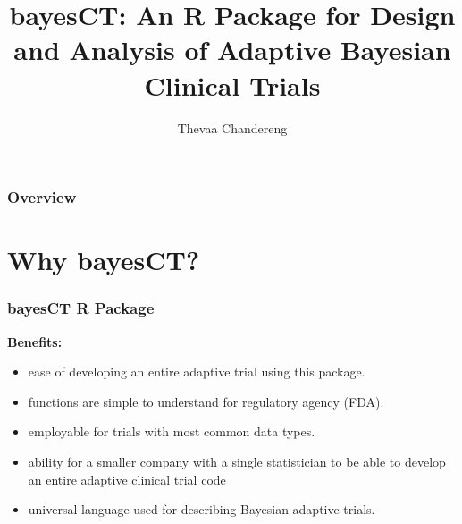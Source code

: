 \documentclass{beamer}
\title[Bayesian Clinical Trials]{bayesCT: An R Package for Design and Analysis of Adaptive Bayesian Clinical Trials} %
\author{Thevaa Chandereng} %
\institute[UW-Madison] %
{
UW-Madison \\ %
\medskip
\textit{Joint Work: \\ Donald Musgrove, Tarek Haddad, Tim Hanson, \\
Graeme Hickey, Ted Lystig (Medtronic) \\ Rick Chappell(UW-Madison)} %
}
\date{} %
\begin{document}
\begin{frame}
\titlepage %
\end{frame}

\begin{frame}
\frametitle{Overview} %
\tableofcontents %
\end{frame}

\section{Why bayesCT?}


\begin{frame}
\frametitle{bayesCT R Package}

\textbf{Benefits:} \\
\begin{itemize}
\item ease of developing an entire adaptive trial using this package.
\item functions are simple to understand for regulatory agency (FDA).
\item employable for trials with most common data types.
\item ability for a smaller company with a single statistician to be able to develop an entire adaptive clinical trial code 
\item universal language used for describing Bayesian adaptive trials.
\end{itemize}
\end{frame}



\end{document}
